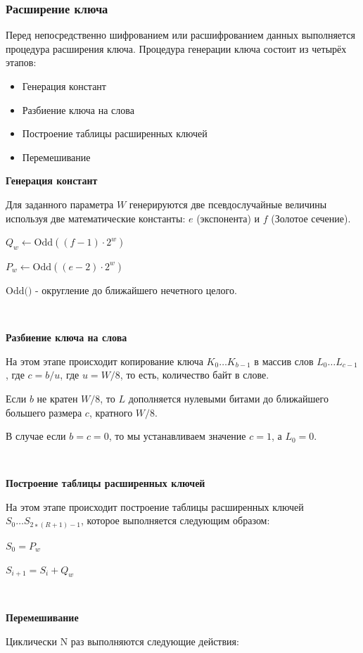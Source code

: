 \documentclass[a4paper]{report}
\begin{document}
\subsubsection{Расширение ключа}
Перед непосредственно шифрованием или расшифрованием данных выполняется процедура расширения ключа. Процедура генерации ключа состоит из четырёх этапов: 

\begin{itemize}

\item Генерация констант
\item Разбиение ключа на слова
\item Построение таблицы расширенных ключей
\item Перемешивание

\end{itemize}

\textbf{Генерация констант}

Для заданного параметра $W$ генерируются две псевдослучайные величины используя две математические константы: $e$ (экспонента) и $f$ (Золотое сечение).

$Q_w \leftarrow \textrm{Odd}((f − 1)\cdot 2^w)$

$P_w \leftarrow \textrm{Odd}((e − 2)\cdot 2^w)$

$\textrm{Odd()}$ - округление до ближайшего нечетного целого.

~

\textbf{Разбиение ключа на слова}

На этом этапе происходит копирование ключа $K_0 … K_{b − 1}$ в массив слов $L_0… L_{c − 1}$, где $c = b / u$, где $u = W / 8$, то есть, количество байт в слове.

Если $b$ не кратен $W / 8$, то $L$ дополняется нулевыми битами до ближайшего большего размера $c$, кратного $W / 8$.

В случае если $b = c = 0$, то мы устанавливаем значение $c = 1$, а $L_0 = 0$.

~

\textbf{Построение таблицы расширенных ключей}

На этом этапе происходит построение таблицы расширенных ключей $S_0 … S_{2 ∗ ( R + 1 ) − 1}$, которое выполняется следующим образом: 

$S_{0}=P_{w}$

$S_{i+1}=S_i+Q_w$

~

\textbf{Перемешивание}

Циклически N раз выполняются следующие действия:
\end{document}
